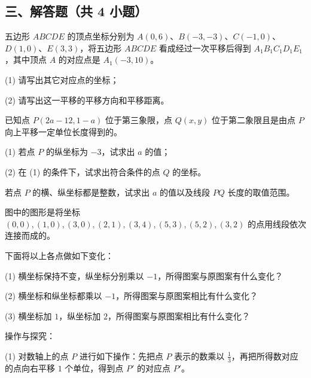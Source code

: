\subsection*{三、解答题（共 4 小题）}

\solutionlist[15]

\item 五边形 $ABCDE$ 的顶点坐标分别为 $A(0, 6)$、$B(-3, -3)$、$C(-1, 0)$、$D(1, 0)$、$E(3, 3)$，将五边形 $ABCDE$ 看成经过一次平移后得到 $A_1B_1C_1D_1E_1$，其中顶点 $A$ 的对应点是 $A_1(-3, 10)$。

(1) 请写出其它对应点的坐标；

(2) 请写出这一平移的平移方向和平移距离。

\vspace{4cm}

\item 已知点 $P(2a-12, 1-a)$ 位于第三象限，点 $Q(x, y)$ 位于第二象限且是由点 $P$ 向上平移一定单位长度得到的。

(1) 若点 $P$ 的纵坐标为 $-3$，试求出 $a$ 的值；

(2) 在 (1) 的条件下，试求出符合条件的点 $Q$ 的坐标。

若点 $P$ 的横、纵坐标都是整数，试求出 $a$ 的值以及线段 $PQ$ 长度的取值范围。


\vspace{5cm}


\item 图中的图形是将坐标 $(0, 0), (1, 0), (3, 0), (2, 1), (3, 4), (5, 3), (5, 2), (3, 2)$ 的点用线段依次连接而成的。


下面将以上各点做如下变化：

(1) 横坐标保持不变，纵坐标分别乘以 $-1$，所得图案与原图案有什么变化？

(2) 横坐标和纵坐标都乘以 $-1$，所得图案与原图案相比有什么变化？

(3) 横坐标加 $1$，纵坐标加 $2$，所得图案与原图案相比有什么变化？


\vspace{5cm}

\newpage 

\item 操作与探究：

(1) 对数轴上的点 $P$ 进行如下操作：先把点 $P$ 表示的数乘以 $\frac{1}{3}$，再把所得数对应的点向右平移 $1$ 个单位，得到点 $P'$ 的对应点 $P'$。

